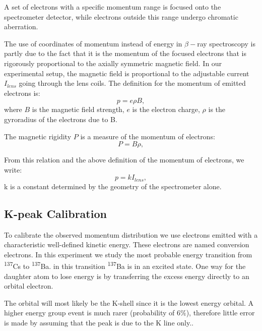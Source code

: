 \documentclass[9pt, a4paper]{article}
\begin{document}
\begin{multicols}{2}
A set of electrons with a specific momentum range is focused onto the spectrometer detector, while electrons outside this range undergo chromatic aberration. 

The use of coordinates of momentum instead of energy in $\beta-$ray spectroscopy is partly due to the fact that it is the momentum of the focused electrons that is rigorously proportional to the axially symmetric magnetic field.\cite{QH, Siegbahn} 
In our experimental setup, the magnetic field is proportional to the adjustable current $I_{lens}$ going through the lens coils.
The definition for the momentum of emitted electrons is:
\begin{equation}p = e \rho B,
\end{equation} 
where $B$ is the magnetic field strength, $e$ is the electron charge, $\rho$ is the gyroradius of the electrons due to B.

The magnetic rigidity $P$ is a measure of the momentum of electrons\cite{Wikipedia-Rigidity}:
\begin{equation}P = B \rho,
\end{equation}

From this relation and the above definition of the momentum of electrons, we write:
\begin{equation}p = kI_{lens},
\end{equation}
k is a constant determined by the geometry of the spectrometer alone\cite{QH}.

\subsection{K-peak Calibration}

To calibrate the observed momentum distribution we use electrons emitted with a characteristic well-defined kinetic energy\cite{SPA}.
These electrons are named conversion electrons.
In this experiment we study the most probable energy transition from \textsuperscript{137}Cs to \textsuperscript{137}Ba. in this transition \textsuperscript{137}Ba is in an excited state. 
One way for the daughter atom to lose energy is by transferring the excess energy directly to an orbital electron\cite{SPA}.

The orbital will most likely be the K-shell since it is the lowest energy orbital. A higher energy group event is much rarer (probability of $6\%$), therefore little error is made  by assuming that the peak is due to the K line only.\cite{SPA}.


\end{multicols}
\end{document}
